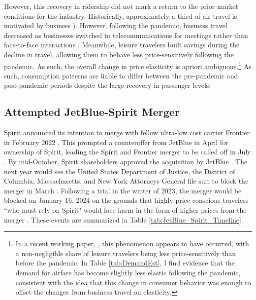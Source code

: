 \documentclass{article}
\begin{document}
	However, this recovery in ridership did not mark a return to the prior market conditions for the industry. Historically, approximately a third of air travel is motivated by business \citep{berry_tracing_2010, bet_market_2021}). However, following the pandemic, business travel decreased as businesses switched to telecommunications for meetings rather than face-to-face interactions \citep{semuels_business_2021}. Meanwhile, leisure travelers built savings during the decline in travel, allowing them to behave less price-sensitively following the pandemic. As such, the overall change in price elasticity is apriori ambiguous.\footnote{In a recent working paper, \citet{ewen_zoom_2023}, this phenomenon appears to have occurred, with a non-negligible share of leisure travelers being less price-sensitively than before the pandemic. In Table \ref{tab:DemandEst}, I find evidence that the demand for airfare has become slightly less elastic following the pandemic, consistent with the idea that this change in consumer behavior was enough to offset the changes from business travel on elasticity.}  As such, consumption patterns are liable to differ between the pre-pandemic and post-pandemic periods despite the large recovery in passenger levels. 

    
	\subsection{Attempted JetBlue-Spirit Merger}
	\label{sec:Setting_Merger}
	Spirit announced its intention to merge with fellow ultra-low cost carrier Frontier in February 2022 \citep{schaper_frontier-spirit_2022}. This prompted a counteroffer from JetBlue in April for ownership of Spirit, leading the Spirit and Frontier merger to be called off in July \citep{josephs_jetblue_2022, josephs_spirit_2022}. By mid-October, Spirit shareholders approved the acquisition by JetBlue \citep{koenig_spirit_2022}. The next year would see the United States Department of Justice, the District of Columbia, Massachusetts, and New York Attorneys General file suit to block the merger in March \citep{chokshi_justice_2023}. Following a trial in the winter of 2023, the merger would be blocked on January 16, 2024 on the grounds that highly price conscious travelers ``who must rely on Spirit" would face harm in the form of higher prices from the merger \citep{william_g_young_findings_2024}. These events are summarized in Table \ref{tab:JetBlue_Spirit_Timeline}. 
\end{document}
